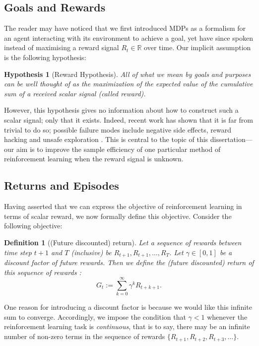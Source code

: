 \documentclass[11pt, a4paper, bibliography=totoc]{report}
\newcommand{\reals}{\mathbb{R}}
\newtheorem{hypothesis}{Hypothesis}
\newtheorem{definition}{Definition}
\begin{document}
\subsection{Goals and Rewards}
The reader may have noticed that we first introduced MDPs as a formalism for an agent interacting with its environment to achieve a goal, yet have since spoken instead of maximising a reward signal $ R_t \in \reals $ over time. Our implicit assumption is the following hypothesis:
\begin{hypothesis}[Reward Hypothesis]
\textit{All of what we mean by goals and purposes can be well thought of as the maximization of the expected value of the cumulative sum of a received scalar signal (called reward).} \cite[p.~53]{Sutton2018}
\end{hypothesis}
However, this hypothesis gives no information about how to construct such a scalar signal; only that it exists. Indeed, recent work has shown that it is far from trivial to do so; possible failure modes include negative side effects, reward hacking and unsafe exploration \cite{Amodei2016}. This is central to the topic of this dissertation---our aim is to improve the sample efficiency of one particular method of reinforcement learning when the reward signal is unknown.

\subsection{Returns and Episodes} \label{rets_and_episodes}
Having asserted that we can express the objective of reinforcement learning in terms of scalar reward, we now formally define this objective. Consider the following objective:
\begin{definition}[(Future discounted) return]
Let a sequence of rewards between time step $ t + 1 $ and $ T $ (inclusive) be $ R_{t+1}, R_{t+1}, \dots, R_T $. Let $ \gamma \in [0, 1] $ be a discount factor of future rewards. Then we define the (future discounted) return of this sequence of rewards \cite[p.~57]{Sutton2018}:
\begin{equation} \label{G_t}
G_t := \sum_{k=0}^{\infty} \gamma^k R_{t+k+1}.
\end{equation}
\end{definition}

One reason for introducing a discount factor is because we would like this infinite sum to converge. Accordingly, we impose the condition that $ \gamma < 1 $ whenever the reinforcement learning task is \textit{continuous}, that is to say, there may be an infinite number of non-zero terms in the sequence of rewards $ \{R_{t+1}, R_{t+2}, R_{t+3}, \dots \} $.
\end{document}
